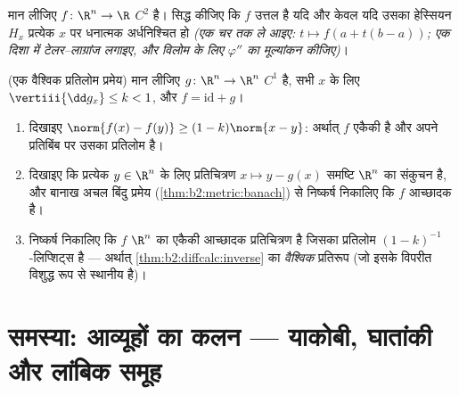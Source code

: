 \begin{exercise}[$\star\star$]\label{exo:b2:diffcalc:11}
मान लीजिए $f \colon \R^n \to \R$ $C^2$ है। सिद्ध कीजिए कि $f$ उत्तल है यदि और केवल यदि उसका
हेस्सियन $H_x$ प्रत्येक $x$ पर धनात्मक अर्धनिश्चित हो \emph{(एक चर तक ले
आइए: $t \mapsto f(a + t(b-a))$; एक दिशा में टेलर--लाग्रांज लगाइए, और विलोम के लिए $\varphi''$ का
मूल्यांकन कीजिए)}।
\end{exercise}

\begin{exercise}[$\star\star\star$]\label{exo:b2:diffcalc:12}
(एक वैश्विक प्रतिलोम प्रमेय) मान लीजिए $g \colon \R^n \to \R^n$ $C^1$ है, सभी $x$ के लिए $\vertiii{\dd g_x} \leq k < 1$, और
$f =
\mathrm{id} + g$।
\begin{enumerate}
  \item दिखाइए $\norm{f(x) - f(y)} \geq (1 - k)\norm{x - y}$: अर्थात् $f$ एकैकी है और अपने प्रतिबिंब पर उसका
        प्रतिलोम  है।
  \item दिखाइए कि प्रत्येक $y \in \R^n$ के लिए प्रतिचित्रण $x \mapsto y -
        g(x)$  समष्टि $\R^n$ का
        संकुचन है, और बानाख अचल बिंदु प्रमेय (\cref{thm:b2:metric:banach}) से निष्कर्ष निकालिए कि
        $f$ आच्छादक है।
  \item निष्कर्ष निकालिए कि $f$ $\R^n$ का एकैकी आच्छादक प्रतिचित्रण है जिसका
        प्रतिलोम $(1-k)^{-1}$-लिप्शिट्स है --- अर्थात् \cref{thm:b2:diffcalc:inverse} का \emph{वैश्विक}
        प्रतिरूप (जो इसके विपरीत विशुद्ध रूप से स्थानीय है)।
\end{enumerate}
\end{exercise}

\section{समस्या: आव्यूहों का कलन --- याकोबी, घातांकी और लांबिक समूह}


